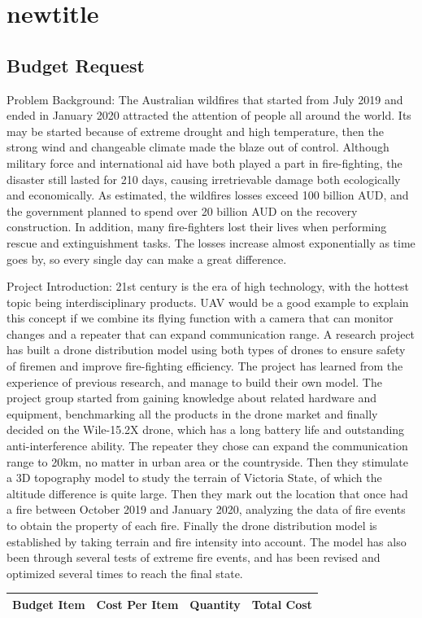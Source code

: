 \documentclass{mcmthesis}
\begin{document}
\section{newtitle}
\begin{appendices}

\section{Budget Request}

Problem Background: The Australian wildfires that started from July 2019 and ended in January 2020 attracted the attention of people all around the world. Its may be started because of extreme drought and high temperature, then the strong wind and changeable climate made the blaze out of control. Although military force and international aid have both played a part in fire-fighting, the disaster still lasted for 210 days, causing irretrievable damage both ecologically and economically. As estimated, the wildfires losses exceed 100 billion AUD, and the government planned to spend over 20 billion AUD on the recovery construction. In addition, many fire-fighters lost their lives when performing rescue and extinguishment tasks. The losses increase almost exponentially as time goes by, so every single day can make a great difference. 

Project Introduction: 21st century is the era of high technology, with the hottest topic being interdisciplinary products. UAV would be a good example to explain this concept if we combine its flying function with a camera that can monitor changes and a repeater that can expand communication range. A research project has built a drone distribution model using both types of drones to ensure safety of firemen and improve fire-fighting efficiency. The project has learned from the experience of previous research, and manage to build their own model. The project group started from gaining knowledge about related hardware and equipment, benchmarking all the products in the drone market and finally decided on the Wile-15.2X drone\cite{7989656}, which has a long battery life and outstanding anti-interference ability. The repeater they chose can expand the communication range to 20km, no matter in urban area or the countryside. Then they stimulate a 3D topography model to study the terrain of Victoria State, of which the altitude difference is quite large. Then they mark out the                 location that once had a fire between October 2019 and January 2020, analyzing the data of fire events to obtain the property of each fire. Finally the drone distribution model is established by taking terrain and fire intensity into account. The model has also been through several tests of extreme fire events, and has been revised and optimized several times to  reach the final state. 
\begin{center}
	\begin{tabular}{cccc}
		\hline
		Budget Item         &    Cost Per Item         &    Quantity &         Total Cost  \\
		\hline
		

\end{tabular}
\end{center}
\end{appendices}
\end{document}
